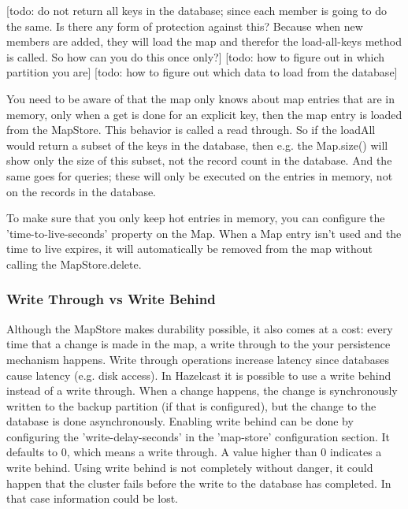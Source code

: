 [todo: do not return all keys in the database; since each member is going to do the same. Is there any form of protection against this? Because when new members are added, they will load the map and therefor the load-all-keys method is called. So how can you do this once only?]
[todo: how to figure out in which partition you are]
[todo: how to figure out which data to load from the database]

You need to be aware of that the map only knows about map entries that are in memory, only when a get is done for an explicit key, then the map entry is loaded from the MapStore. This behavior is called a read through. So if the loadAll would return a subset of the keys in the database, then e.g. the Map.size() will show only the size of this subset, not the record count in the database. And the same goes for queries; these will only be executed on the entries in memory, not on the records in the database.

To make sure that you only keep hot entries in memory, you can configure the 'time-to-live-seconds' property on the Map. When a Map entry isn't used and the time to live expires, it will automatically be removed from the map without calling the MapStore.delete. 

\subsubsection*{Write Through vs Write Behind}
Although the MapStore makes durability possible, it also comes at a cost: every time that a change is made in the map, a write through to the your persistence mechanism happens. Write through operations increase latency since databases cause latency (e.g. disk access). In Hazelcast it is possible to use a write behind instead of a write through. When a change happens, the change is synchronously written to the backup partition (if that is configured), but the change to the database is done asynchronously. Enabling write behind can be done by configuring the 'write-delay-seconds' in the 'map-store' configuration section. It defaults to 0, which means a write through. A value higher than 0 indicates a write behind. Using write behind is not completely without danger, it could happen that the cluster fails before the write to the database has completed. In that case information could be lost.

